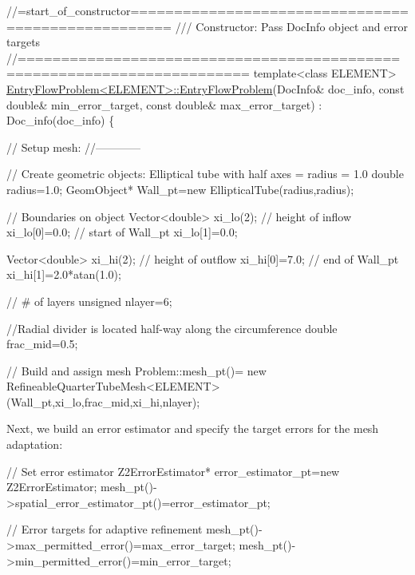 \begin{DoxyCodeInclude}
\textcolor{comment}{//=start\_of\_constructor===================================================}
\textcolor{comment}{/// Constructor: Pass DocInfo object and error targets}
\textcolor{comment}{}\textcolor{comment}{//========================================================================}
\textcolor{keyword}{template}<\textcolor{keyword}{class} ELEMENT>
\hyperlink{classEntryFlowProblem_a0d527811321d270d769224dcbac8d240}{EntryFlowProblem<ELEMENT>::EntryFlowProblem}(DocInfo& doc\_info,
                                            \textcolor{keyword}{const} \textcolor{keywordtype}{double}& min\_error\_target,
                                            \textcolor{keyword}{const} \textcolor{keywordtype}{double}& max\_error\_target) 
 : Doc\_info(doc\_info)
\{ 

 \textcolor{comment}{// Setup mesh:}
 \textcolor{comment}{//------------}

 \textcolor{comment}{// Create geometric objects: Elliptical tube with half axes = radius = 1.0}
 \textcolor{keywordtype}{double} radius=1.0;
 GeomObject* Wall\_pt=\textcolor{keyword}{new} EllipticalTube(radius,radius);

 \textcolor{comment}{// Boundaries on object}
 Vector<double> xi\_lo(2);
 \textcolor{comment}{// height of inflow}
 xi\_lo[0]=0.0;
 \textcolor{comment}{// start of Wall\_pt}
 xi\_lo[1]=0.0;

 Vector<double> xi\_hi(2);
 \textcolor{comment}{// height of outflow}
 xi\_hi[0]=7.0;
 \textcolor{comment}{// end of Wall\_pt}
 xi\_hi[1]=2.0*atan(1.0);

 \textcolor{comment}{// # of layers}
 \textcolor{keywordtype}{unsigned} nlayer=6;

 \textcolor{comment}{//Radial divider is located half-way along the circumference}
 \textcolor{keywordtype}{double} frac\_mid=0.5;

 \textcolor{comment}{// Build and assign mesh}
 Problem::mesh\_pt()=
  \textcolor{keyword}{new} RefineableQuarterTubeMesh<ELEMENT>(Wall\_pt,xi\_lo,frac\_mid,xi\_hi,nlayer);

\end{DoxyCodeInclude}


Next, we build an error estimator and specify the target errors for the mesh adaptation\+:


\begin{DoxyCodeInclude}
 

 \textcolor{comment}{// Set error estimator }
 Z2ErrorEstimator* error\_estimator\_pt=\textcolor{keyword}{new} Z2ErrorEstimator;
 mesh\_pt()->spatial\_error\_estimator\_pt()=error\_estimator\_pt;
 
 \textcolor{comment}{// Error targets for adaptive refinement}
 mesh\_pt()->max\_permitted\_error()=max\_error\_target; 
 mesh\_pt()->min\_permitted\_error()=min\_error\_target; 

\end{DoxyCodeInclude}


